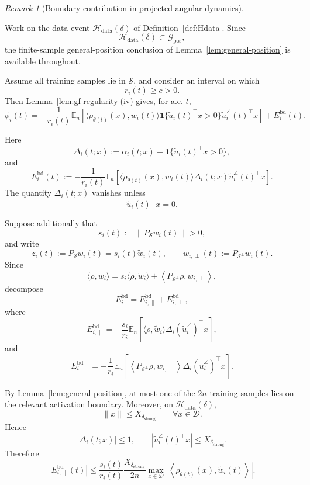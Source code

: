 \documentclass{article} %
\theoremstyle{plain}
\theoremstyle{definition}
\theoremstyle{remark}
\newtheorem{remark}[theorem]{Remark}
\begin{document}
\begin{remark}[Boundary contribution in projected angular dynamics]
\label{rem:angular-boundary-selection}

Work on the data event $\mathcal H_{\mathrm{data}}(\delta)$ of
Definition~\ref{def:Hdata}. Since
\[
\mathcal H_{\mathrm{data}}(\delta)
\subset
\mathcal G_{\mathrm{pos}},
\]
the finite-sample general-position conclusion of
Lemma~\ref{lem:general-position} is available throughout.

Assume all training samples lie in $\mathcal S$, and consider an interval on
which
\[
r_i(t)\ge c>0.
\]
Then Lemma~\ref{lem:gf-regularity}\textnormal{(iv)} gives, for a.e. $t$,
\[
\boxed{
\dot\phi_i(t)
=
-\frac1{r_i(t)}
\mathbb E_n
\left[
\langle
\rho_{\theta(t)}(x),
w_i(t)
\rangle
\mathbf 1
\{
\widetilde u_i(t)^\top x>0
\}
\widetilde u_i^\angle(t)^\top x
\right]
+
E_i^{\mathrm{bd}}(t).
}
\]

Here
\[
\Delta_i(t;x)
:=
\alpha_i(t;x)
-
\mathbf 1
\{
\widetilde u_i(t)^\top x>0
\},
\]
and
\[
E_i^{\mathrm{bd}}(t)
:=
-\frac1{r_i(t)}
\mathbb E_n
\left[
\langle
\rho_{\theta(t)}(x),
w_i(t)
\rangle
\Delta_i(t;x)
\widetilde u_i^\angle(t)^\top x
\right].
\]
The quantity $\Delta_i(t;x)$ vanishes unless
\[
\widetilde u_i(t)^\top x=0.
\]

Suppose additionally that
\[
s_i(t)
:=
\|P_{\mathcal S}w_i(t)\|
>0,
\]
and write
\[
z_i(t)
:=
P_{\mathcal S}w_i(t)
=
s_i(t)\widetilde w_i(t),
\qquad
w_{i,\perp}(t)
:=
P_{\mathcal S^\perp}w_i(t).
\]
Since
\[
\langle\rho,w_i\rangle
=
s_i
\langle\rho,\widetilde w_i\rangle
+
\left\langle
P_{\mathcal S^\perp}\rho,
w_{i,\perp}
\right\rangle,
\]
decompose
\[
E_i^{\mathrm{bd}}
=
E_{i,\parallel}^{\mathrm{bd}}
+
E_{i,\perp}^{\mathrm{bd}},
\]
where
\[
E_{i,\parallel}^{\mathrm{bd}}
=
-\frac{s_i}{r_i}
\mathbb E_n
\left[
\langle
\rho,
\widetilde w_i
\rangle
\Delta_i
(\widetilde u_i^\angle)^\top x
\right],
\]
and
\[
E_{i,\perp}^{\mathrm{bd}}
=
-\frac1{r_i}
\mathbb E_n
\left[
\left\langle
P_{\mathcal S^\perp}\rho,
w_{i,\perp}
\right\rangle
\Delta_i
(\widetilde u_i^\angle)^\top x
\right].
\]

By Lemma~\ref{lem:general-position}, at most one of the $2n$ training
samples lies on the relevant activation boundary. Moreover, on
$\mathcal H_{\mathrm{data}}(\delta)$,
\[
\|x\|
\le
X_{\delta_{\mathrm{strong}}}
\qquad
\forall x\in\mathcal D.
\]
Hence
\[
|\Delta_i(t;x)|\le1,
\qquad
|\widetilde u_i^\angle(t)^\top x|
\le
X_{\delta_{\mathrm{strong}}}.
\]
Therefore
\[
\boxed{
|E_{i,\parallel}^{\mathrm{bd}}(t)|
\le
\frac{s_i(t)}{r_i(t)}
\frac{X_{\delta_{\mathrm{strong}}}}{2n}
\max_{x\in\mathcal D}
\left|
\left\langle
\rho_{\theta(t)}(x),
\widetilde w_i(t)
\right\rangle
\right|.
}
\]


\end{remark}
\end{document}
